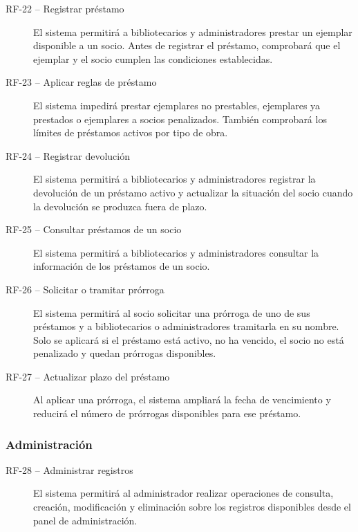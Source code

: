 \begin{description}
	\item[RF-22 -- Registrar préstamo]
	El sistema permitirá a bibliotecarios y administradores prestar un ejemplar disponible a un socio. Antes de registrar el préstamo, comprobará que el ejemplar y el socio cumplen las condiciones establecidas.
	
	\item[RF-23 -- Aplicar reglas de préstamo]
	El sistema impedirá prestar ejemplares no prestables, ejemplares ya	prestados o ejemplares a socios penalizados. También comprobará los	límites de préstamos activos por tipo de obra.
	
	\item[RF-24 -- Registrar devolución]
	El sistema permitirá a bibliotecarios y administradores registrar la devolución de un préstamo activo y actualizar la situación del socio cuando la devolución se produzca fuera de plazo.
	
	\item[RF-25 -- Consultar préstamos de un socio]
	El sistema permitirá a bibliotecarios y administradores consultar la información de los préstamos de un socio.
	
	\item[RF-26 -- Solicitar o tramitar prórroga]
	El sistema permitirá al socio solicitar una prórroga de uno de sus préstamos y a bibliotecarios o administradores tramitarla en su nombre. Solo se aplicará si el préstamo está activo, no ha vencido, el socio no está penalizado y quedan prórrogas disponibles.
	
	\item[RF-27 -- Actualizar plazo del préstamo]
	Al aplicar una prórroga, el sistema ampliará la fecha de vencimiento y reducirá el número de prórrogas disponibles para ese préstamo.
\end{description}

\subsubsection{Administración}

\begin{description}
	\item[RF-28 -- Administrar registros]
	El sistema permitirá al administrador realizar operaciones de consulta,	creación, modificación y eliminación sobre los registros disponibles	desde el panel de administración.
\end{description}

